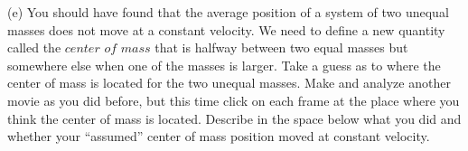 (e) You should have found that the average position of a system of two unequal masses does not move at a constant velocity. We need to define a new quantity called the $center$ $of$ $mass$ that is halfway between two equal masses but somewhere else when one of the masses is larger. Take a guess as to where the center of mass is located for the two unequal masses. Make and analyze another movie as you did before, but this time click on each frame at the place where you think the center of mass is located. Describe in the space below what you did and whether your ``assumed'' center of mass position moved at constant velocity.


